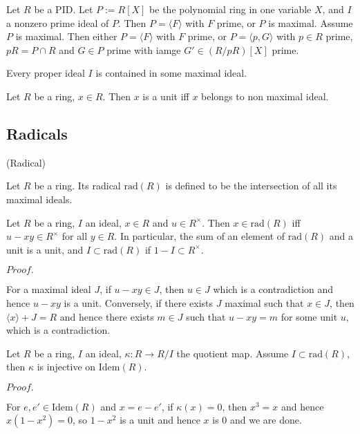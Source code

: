 \documentclass{article}
\newcommand{\Pf}[1]{$Proof.$\par}
\begin{document}
\begin{theorem}
    Let $R$ be a PID. Let $P:=R[X]$ be the polynomial ring in one variable $X$, and $I$ a nonzero prime ideal of $P$. Then $P = \langle F\rangle$ with $F$ prime, or $P$ is maximal. Assume $P$ is maximal. Then either $P = \langle F\rangle $ with $F$ prime, or $P=\langle p, G\rangle$ with $p\in R$ prime, $pR = P\cap R$ and $G\in P$ prime with iamge $G'\in (R/pR)[X]$ prime.
\end{theorem}

\begin{theorem}
    Every proper ideal $I$ is contained in some maximal ideal.
\end{theorem}

\begin{corollary}
    Let $R$ be a ring, $x\in R$. Then $x$ is a unit iff $x$ belongs to non maximal ideal.
\end{corollary}

\subsection{Radicals}

\begin{definition}
    (Radical)\par
    Let $R$ be a ring. Its radical $\text{rad}(R)$ is defined to be the intersection of all its maximal ideals. 
\end{definition}

\begin{proposition}
    Let $R$ be a ring, $I$ an ideal, $x\in R$ and $u\in R^{\times}$. Then $x\in \text{rad}(R)$ iff $u-xy\in R^{\times}$ for all $y\in R$. In particular, the sum of an element of $\text{rad}(R)$ and a unit is a unit, and $I\subset \text{rad}(R)$ if $1-I\subset R^{\times}$.
\end{proposition}
\Pf\par
    For a maximal ideal $J$, if $u-xy\in J$, then $u\in J$ which is a contradiction and hence $u-xy$ is a unit. Conversely, if there exists $J$ maximal such that $x\in J$, then $\langle x\rangle + J = R$ and hence there exists $m\in J$ such that $u-xy = m$ for some unit $u$, which is a contradiction.\par

\begin{corollary}
    Let $R$ be a ring, $I$ an ideal, $\kappa:R\to R/I$ the quotient map. Assume $I\subset \text{rad}(R)$, then $\kappa$ is injective on $\text{Idem}(R)$.
\end{corollary}
\Pf\par
    For $e,e'\in \text{Idem}(R)$ and $x = e-e'$, if $\kappa(x) = 0$, then $x^3 = x$ and hence $x(1-x^2) = 0$, so $1-x^2$ is a unit and hence $x$ is $0$ and we are done.
\end{document}
